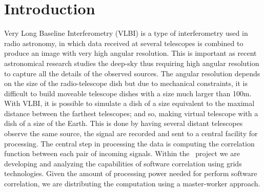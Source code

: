 \section{Introduction}
Very Long Baseline Interferometry (VLBI) \cite{VLBIbook} is a type of
interferometry used in radio astronomy, in which data received at
several telescopes is combined to produce an image with very high
angular resolution. 
This is important as recent astronomical research studies the deep-sky
thus requiring high angular resolution to capture all the details of
the observed sources.  The angular resolution depends on the size of
the radio-telescope dish but due to mechanical constraints, it is
difficult to build moveable telescope dishes with a size much larger
than 100m. With VLBI, it is possible to simulate a dish of a size
equivalent to the maximal distance between the farthest telescopes;
and so, making virtual telescope with a dish of a size of the
Earth. This is done by having several distant telescopes observe the
same source, the signal are recorded and sent to a central facility
for processing. The central step in processing the data is computing
the correlation function between each pair of incoming signals. Within
the \scarie\ project we are developing and analyzing the capabilities
of software correlation using grids technologies. Given the amount of
processing power needed for perform software correlation, we are
distributing the computation using a master-worker approach.

